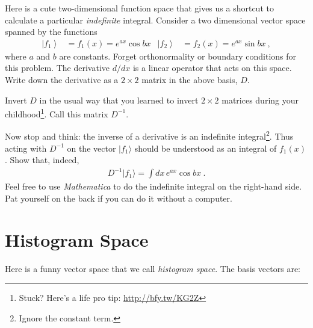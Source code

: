 \documentclass[12pt, oneside]{report}    %
\let\oldsection\section
\def\section{%
  \setcounter{sidenote}{1}%
  \oldsection
}
\begin{document}
\begin{exercise}

Here is a cute two-dimensional function space that gives us a shortcut to calculate a particular \emph{indefinite} integral.  Consider a two dimensional vector space spanned by the functions
\begin{align}
  \left|f_1\right\rangle
  &= f_1(x) = 
  e^{ax} \cos bx
  &
  \left|f_2\right\rangle
  &=
  f_2(x) = 
  e^{ax} \sin bx \ ,
\end{align}
where $a$ and $b$ are constants. Forget orthonormality or boundary conditions for this problem. The derivative $d/dx$ is a linear operator that acts on this space. Write down the derivative as a $2\times 2$ matrix in the above basis, $D$.

Invert $D$ in the usual way that you learned to invert $2\times 2$ matrices during your childhood\footnote{Stuck? Here's a life pro tip: \url{http://bfy.tw/KG2Z}}. Call this matrix $D^{-1}$. 

Now stop and think: the inverse of a derivative is an indefinite integral\footnote{Ignore the constant term.}. Thus acting with $D^{-1}$ on the vector $|f_1\rangle$ should be understood as an integral of $f_1(x)$. Show that, indeed,
\begin{align}
  D^{-1} |f_1\rangle = \int dx\, e^{ax} \cos bx \ .
\end{align}
Feel free to use \emph{Mathematica} to do the indefinite integral on the right-hand side. Pat yourself on the back if you can do it without a computer.
\end{exercise}


\section{Histogram Space}
\label{sec:histogramspace}

Here is a funny vector space that we call \emph{histogram space}. The basis vectors are:
\end{document}
